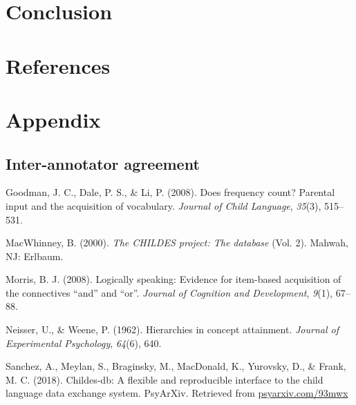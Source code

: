 \documentclass[floatsintext,man]{apa6}
\theoremstyle{definition}
\theoremstyle{definition}
\theoremstyle{definition}
\theoremstyle{remark}
\begin{document}
\section{Conclusion}\label{conclusion}

\newpage

\section{References}\label{references}

\section{Appendix}\label{appendix}

\subsection{Inter-annotator agreement}\label{inter-annotator-agreement}

\setlength{\parindent}{-0.5in} \setlength{\leftskip}{0.5in}

\hypertarget{refs}{}
\hypertarget{ref-goodman2008does}{}
Goodman, J. C., Dale, P. S., \& Li, P. (2008). Does frequency count?
Parental input and the acquisition of vocabulary. \emph{Journal of Child
Language}, \emph{35}(3), 515--531.

\hypertarget{ref-macwhinney2000childes}{}
MacWhinney, B. (2000). \emph{The CHILDES project: The database} (Vol.
2). Mahwah, NJ: Erlbaum.

\hypertarget{ref-morris2008logically}{}
Morris, B. J. (2008). Logically speaking: Evidence for item-based
acquisition of the connectives ``and'' and ``or''. \emph{Journal of
Cognition and Development}, \emph{9}(1), 67--88.

\hypertarget{ref-neisser1962hierarchies}{}
Neisser, U., \& Weene, P. (1962). Hierarchies in concept attainment.
\emph{Journal of Experimental Psychology}, \emph{64}(6), 640.

\hypertarget{ref-sanchez2018childes}{}
Sanchez, A., Meylan, S., Braginsky, M., MacDonald, K., Yurovsky, D., \&
Frank, M. C. (2018). Childes-db: A flexible and reproducible interface
to the child language data exchange system. PsyArXiv. Retrieved from
\url{psyarxiv.com/93mwx}
\end{document}
